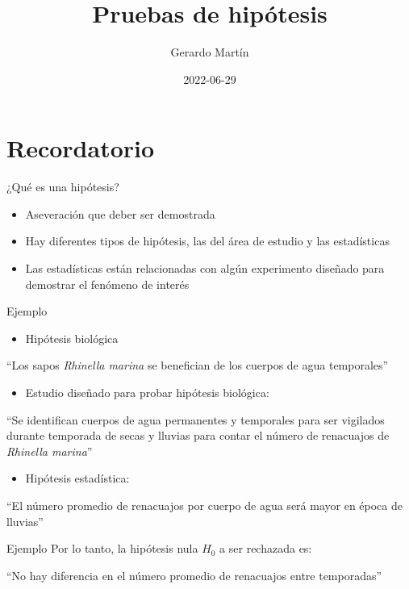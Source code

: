 \documentclass[
  11pt,
  ignorenonframetext,
]{beamer}
\title{Pruebas de hipótesis}
\author{Gerardo Martín}
\date{2022-06-29}
\providecommand{\tightlist}{%
  \setlength{\itemsep}{0pt}\setlength{\parskip}{0pt}}
\begin{document}
\frame{\titlepage}

\hypertarget{recordatorio}{%
\section{Recordatorio}\label{recordatorio}}

\begin{frame}{¿Qué es una hipótesis?}
\protect\hypertarget{quuxe9-es-una-hipuxf3tesis}{}
\begin{itemize}
\item
  Aseveración que deber ser demostrada
\item
  Hay diferentes tipos de hipótesis, las del área de estudio y las
  estadísticas
\item
  Las estadísticas están relacionadas con algún experimento diseñado
  para demostrar el fenómeno de interés
\end{itemize}
\end{frame}

\begin{frame}{Ejemplo}
\protect\hypertarget{ejemplo}{}
\begin{itemize}
\tightlist
\item
  Hipótesis biológica
\end{itemize}

``Los sapos \emph{Rhinella marina} se benefician de los cuerpos de agua
temporales''

\begin{itemize}
\tightlist
\item
  Estudio diseñado para probar hipótesis biológica:
\end{itemize}

``Se identifican cuerpos de agua permanentes y temporales para ser
vigilados durante temporada de secas y lluvias para contar el número de
renacuajos de \emph{Rhinella marina}''

\begin{itemize}
\tightlist
\item
  Hipótesis estadística:
\end{itemize}

``El número promedio de renacuajos por cuerpo de agua será mayor en
época de lluvias''
\end{frame}

\begin{frame}{Ejemplo}
\protect\hypertarget{ejemplo-1}{}
Por lo tanto, la hipótesis nula \(H_0\) a ser rechazada es:

``No hay diferencia en el número promedio de renacuajos entre
temporadas''
\end{frame}
\end{document}
